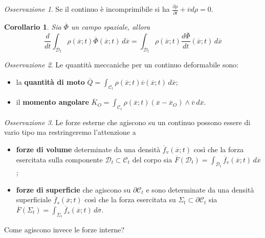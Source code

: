 \documentclass{book}
\theoremstyle{plain}
\theoremstyle{plain}
\theoremstyle{plain}
\theoremstyle{plain}
\newtheorem*{cor}{Corollario}
\theoremstyle{plain}
\theoremstyle{definition}
\theoremstyle{remark}
\newtheorem*{oss}{Osservazione}
\theoremstyle{definition}
\begin{document}
\begin{oss}
    Se il continuo è incomprimibile si ha $\frac{\partial \rho}{\partial t} + \overline{v}d\rho=0$.
\end{oss}

\begin{cor}
    Sia $\overline{\Phi}$ un campo spaziale, allora
    \begin{displaymath}
        \frac{d}{dt}\int_{\mathcal{D}_t}\rho(\overline{x};t)\overline{\Phi}(\overline{x};t)\,d\overline{x}=\int_{\mathcal{D}_t}\rho(\overline{x};t)\frac{d\overline{\Phi}}{dt}(\overline{x};t)\,d\overline{x}
    \end{displaymath}
\end{cor}

\begin{oss}
    Le quantità meccaniche per un continuo deformabile sono:
    \begin{itemize}
        \item la \textbf{quantità di moto} $\overline{Q}=\int_{\mathcal{C}_t}\rho(\overline{x};t)\overline{v}(\overline{x};t)\,d\overline{x}$;
        \item il \textbf{momento angolare} $\overline{K}_O=\int_{\mathcal{C}_t}\rho(\overline{x};t)(\overline{x}-\overline{x}_O)\wedge\overline{v}\,d\overline{x}$.
    \end{itemize}
\end{oss}

\begin{oss}
    Le forze esterne che agiscono su un continuo possono essere di vario tipo ma restringeremo l'attenzione a
    \begin{itemize}
        \item \textbf{forze di volume} determinate da una densità $\overline{f}_v(\overline{x};t)$ così che la forza esercitata sulla componente  $\mathcal{D}_t\subset\mathcal{C}_t$ del corpo sia $\overline{F}(\mathcal{D}_t)=\int_{\mathcal{D}_t}\overline{f}_v(\overline{x};t)\,d\overline{x}$;
        \item \textbf{forze di superficie} che agiscono su $\partial\mathcal{C}_t$ e sono determinate da una densità superficiale $\overline{f}_s(\overline{x};t)$ così che la forza esercitata su $\Sigma_t\subset\partial\mathcal{C}_t$ sia $\overline{F}(\Sigma_t)=\int_{\Sigma_t}\overline{f}_s(\overline{x};t)\,d\overline{\sigma}$.
    \end{itemize}
\end{oss}

\noindent Come agiscono invece le forze interne?
\end{document}
